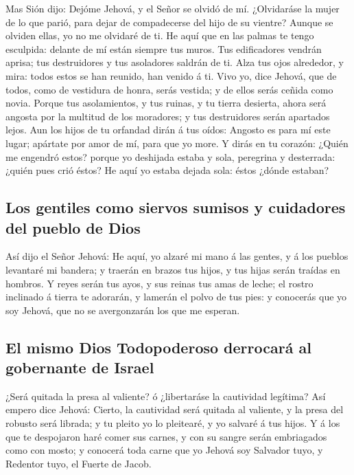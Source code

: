  Mas Sión dijo: Dejóme Jehová, y el Señor se olvidó de
mí.  ¿Olvidaráse la mujer de lo que parió, para dejar de
compadecerse del hijo de su vientre? Aunque se olviden ellas, yo no me
olvidaré de ti.  He aquí que en las palmas te tengo
esculpida: delante de mí están siempre tus muros.  Tus
edificadores vendrán aprisa; tus destruidores y tus asoladores saldrán
de ti.  Alza tus ojos alrededor, y mira: todos estos se
han reunido, han venido á ti. Vivo yo, dice Jehová, que de todos, como
de vestidura de honra, serás vestida; y de ellos serás ceñida como
novia.  Porque tus asolamientos, y tus ruinas, y tu
tierra desierta, ahora será angosta por la multitud de los moradores; y
tus destruidores serán apartados lejos.  Aun los hijos de
tu orfandad dirán á tus oídos: Angosto es para mí este lugar; apártate
por amor de mí, para que yo more.  Y dirás en tu corazón:
¿Quién me engendró estos? porque yo deshijada estaba y sola, peregrina y
desterrada: ¿quién pues crió éstos? He aquí yo estaba dejada sola: éstos
¿dónde estaban?

\hypertarget{los-gentiles-como-siervos-sumisos-y-cuidadores-del-pueblo-de-dios}{%
\subsection{Los gentiles como siervos sumisos y cuidadores del pueblo de
Dios}\label{los-gentiles-como-siervos-sumisos-y-cuidadores-del-pueblo-de-dios}}

 Así dijo el Señor Jehová: He aquí, yo alzaré mi mano á
las gentes, y á los pueblos levantaré mi bandera; y traerán en brazos
tus hijos, y tus hijas serán traídas en hombros.  Y reyes
serán tus ayos, y sus reinas tus amas de leche; el rostro inclinado á
tierra te adorarán, y lamerán el polvo de tus pies: y conocerás que yo
soy Jehová, que no se avergonzarán los que me esperan.

\hypertarget{el-mismo-dios-todopoderoso-derrocaruxe1-al-gobernante-de-israel}{%
\subsection{El mismo Dios Todopoderoso derrocará al gobernante de
Israel}\label{el-mismo-dios-todopoderoso-derrocaruxe1-al-gobernante-de-israel}}

 ¿Será quitada la presa al valiente? ó ¿libertaráse la
cautividad legítima?  Así empero dice Jehová: Cierto, la
cautividad será quitada al valiente, y la presa del robusto será
librada; y tu pleito yo lo pleitearé, y yo salvaré á tus hijos.
 Y á los que te despojaron haré comer sus carnes, y con
su sangre serán embriagados como con mosto; y conocerá toda carne que yo
Jehová soy Salvador tuyo, y Redentor tuyo, el Fuerte de Jacob.

